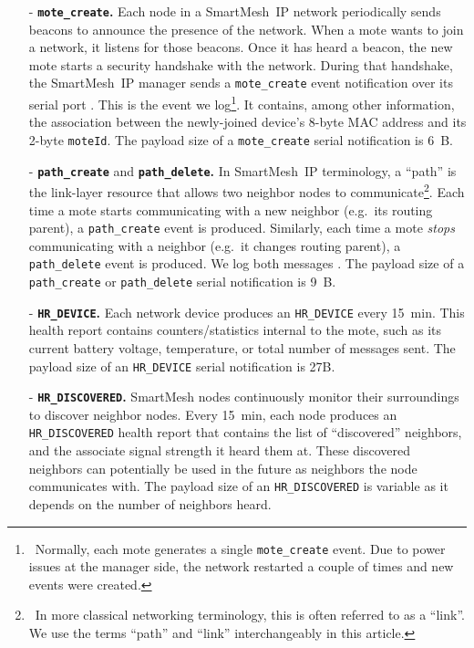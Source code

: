 \documentclass{elsarticle}
\newcommand{\sm}                  {SmartMesh\xspace}
\newcommand{\smip}                {SmartMesh~IP\xspace}
\newcommand{\HRDISCOVERED}        {{\tt HR\_DISCOVERED}\xspace}
\newcommand{\HRDEVICE}            {{\tt HR\_DEVICE}\xspace}
\newcommand{\pathcreate}          {{\tt path\_create}\xspace}
\newcommand{\pathdelete}          {{\tt path\_delete}\xspace}
\newcommand{\motecreate}          {{\tt mote\_create}\xspace}
\newcommand{\moteId}              {{\tt moteId}\xspace}
\begin{document}
\begin{itemize}
    \item[-] \textbf{\motecreate.}
        Each node in a \smip network periodically sends beacons to announce the presence of the network.
        When a mote wants to join a network, it listens for those beacons.
        Once it has heard a beacon, the new mote starts a security handshake with the network.
        During that handshake, the \smip manager sends a \motecreate event notification over its serial port \cite{smip_manager_api}.
        This is the event we log\footnote{~Normally, each mote generates a single \motecreate event. Due to power issues at the manager side, the network restarted a couple of times and new events were created.}.
        It contains, among other information, the association between the newly-joined device's 8-byte MAC address and its 2-byte \moteId.
        The payload size of a \motecreate serial notification is 6~B.
    \item[-] \textbf{\pathcreate} and \textbf{\pathdelete.}
        In \smip terminology, a ``path'' is the link-layer resource that allows two neighbor nodes to communicate\footnote{~In more classical networking terminology, this is often referred to as a ``link''. We use the terms ``path'' and ``link'' interchangeably in this article.}.
        Each time a mote starts communicating with a new neighbor (e.g.~its routing parent), a \pathcreate event is produced.
        Similarly, each time a mote \textit{stops} communicating with a neighbor (e.g.~it changes routing parent), a \pathdelete event is produced.
        We log both messages \cite{smip_manager_api}.
        The payload size of a \pathcreate or \pathdelete serial notification is 9~B.
    \item[-] \textbf{\HRDEVICE.}
        Each network device produces an \HRDEVICE every 15~min.
        This health report contains counters/statistics internal to the mote, such as its current battery voltage, temperature, or total number of messages sent.
        The payload size of an \HRDEVICE serial notification is 27B.
    \item[-] \textbf{\HRDISCOVERED.}
        \sm nodes continuously monitor their surroundings to discover neighbor nodes.
        Every 15~min, each node produces an \HRDISCOVERED health report that contains the list of ``discovered'' neighbors, and the associate signal strength it heard them at.
        These discovered neighbors can potentially be used in the future as neighbors the node communicates with.
        The payload size of an \HRDISCOVERED is variable as it depends on the number of neighbors heard.

\end{itemize}
\end{document}
